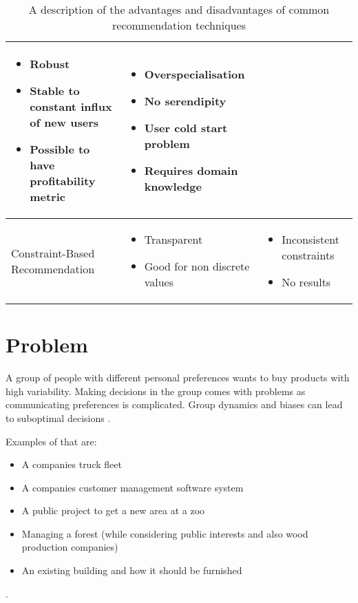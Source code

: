 \documentclass{article}
\begin{document}
\begin{table}
\begin{center}
\begin{tabularx}{\columnwidth}{X|X|X}
\begin{itemize}
                    \item Robust
                    \item Stable to constant influx of new users
                    \item Possible to have profitability metric
                \end{itemize}
            &   \begin{itemize}
                    \item Overspecialisation
                    \item No serendipity
                    \item User cold start problem
                    \item Requires domain knowledge
                \end{itemize} \\
            \hline
            Constraint-Based Recommendation 
            &   \begin{itemize}
                    \item Transparent
                    \item Good for non discrete values
                \end{itemize}
            &   \begin{itemize}
                    \item Inconsistent constraints
                    \item No results
                \end{itemize} \\ 
        \end{tabularx}
        \caption{A description of the advantages and disadvantages of common recommendation techniques}
        \label{tab:RecommenderComparison}
    \end{center}
\end{table}

\FloatBarrier

\section{Problem}
A group of people with different personal preferences wants to buy products with high variability. Making decisions in the group comes with problems as communicating preferences is complicated. Group dynamics and biases can lead to suboptimal decisions \cite{kerrBiasJudgmentComparing1996}. 

Examples of that are:
\begin{itemize}
    \item A companies truck fleet
    \item A companies customer management software system
    \item A public project to get a new area at a zoo
    \item Managing a forest (while considering public interests and also wood production companies)
    \item An existing building and how it should be furnished
\end{itemize}. 
\end{document}
